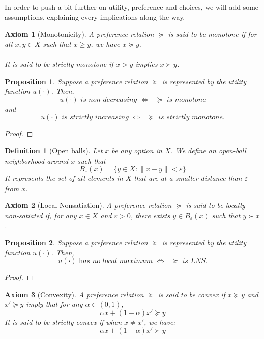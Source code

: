 \documentclass[12pt]{report}
\newtheorem{definition}{Definition}[chapter]
\newtheorem{proposition}{Proposition}[chapter]
\newtheorem{axiom}{Axiom}[chapter]
\begin{document}
In order to push a bit further on utility, preference and choices, we will add some assumptions, explaining every implications along the way.

\begin{axiom}[Monotonicity]
A preference relation $\succeq$ is said to be monotone if for all $x,y\in X$ such that $x\geq y$, we have $x\succeq y$.\\ \\ It is said to be strictly monotone if $x>y$ implies $x\succ y$.
\end{axiom}

\begin{proposition}
Suppose a preference relation $\succeq$ is represented by the utility function $u(\cdot)$. Then, $$u(\cdot)\textit{ is non-decreasing }\Leftrightarrow \textit{ }\succeq \textit{ is monotone} $$ and $$u(\cdot)\textit{ is strictly increasing }\Leftrightarrow \textit{ }\succeq \textit{ is strictly monotone.} $$
\end{proposition}

\begin{proof}

\end{proof}

\begin{definition}[Open balls]
Let $x$ be any option in $X$. We define an open-ball neighborhood around $x$ such that $$B_{\varepsilon}(x) = \{ y\in X: \lVert x - y \rVert < \varepsilon \} $$ It represents the set of all elements in $X$ that are at a smaller distance than $\varepsilon$ from $x$.
\end{definition}

\begin{axiom}[Local-Nonsatiation]
A preference relation $\succeq$ is said to be locally non-satiated if, for any $x\in X$ and $\varepsilon >0$, there exists $y\in B_{\varepsilon}(x)$ such that $y\succ x$.
\end{axiom}

\begin{proposition}
Suppose a preference relation $\succeq$ is represented by the utility function $u(\cdot)$. Then, $$ u(\cdot)\textit{ has no local maximum }\Leftrightarrow \textit{ }\succeq \textit{ is LNS.} $$
\end{proposition}

\begin{proof}

\end{proof}

\begin{axiom}[Convexity]
A preference relation $\succeq$ is said to be convex if $x\succeq y$ and $x'\succeq y$ imply that for any $\alpha\in (0,1)$, $$\alpha x + (1 - \alpha)x' \succeq y $$ It is said to be strictly convex if when $x\neq x'$, we have: $$\alpha x + (1 - \alpha)x' \succ y $$ 
\end{axiom}
\end{document}

